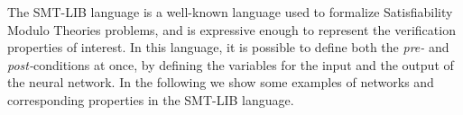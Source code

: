 The SMT-LIB language is a well-known language used to formalize 
Satisfiability Modulo Theories problems, and is expressive enough to
represent the verification properties of interest. In this language, 
it is possible to define both the \textit{pre-} and 
\textit{post-}conditions at once, by defining the variables for the
input and the output of the neural network. In the following we
show some examples of networks and corresponding properties in the
SMT-LIB language.